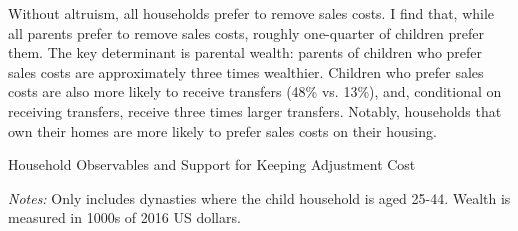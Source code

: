 \documentclass[12pt]{article}
\begin{document}
Without altruism, all households prefer to remove sales costs. I find that, while all parents prefer to remove sales costs, roughly one-quarter of children prefer them. The key determinant is parental wealth: parents of children who prefer sales costs are approximately three times wealthier. Children who prefer sales costs are also more likely to receive transfers (48\% vs. 13\%), and, conditional on receiving transfers, receive three times larger transfers. Notably, households that own their homes are more likely to prefer sales costs on their housing.

\begin{table}
	\center
	\caption{Household Observables and Support for Keeping Adjustment Cost}\label{tab:adjcost}
	\begin{threeparttable}
		
		\footnotesize
		\textit{Notes:} Only includes dynasties where the child household is aged 25-44. Wealth is measured in 1000s of 2016 US dollars.
	\end{threeparttable}
\end{table}
\end{document}

